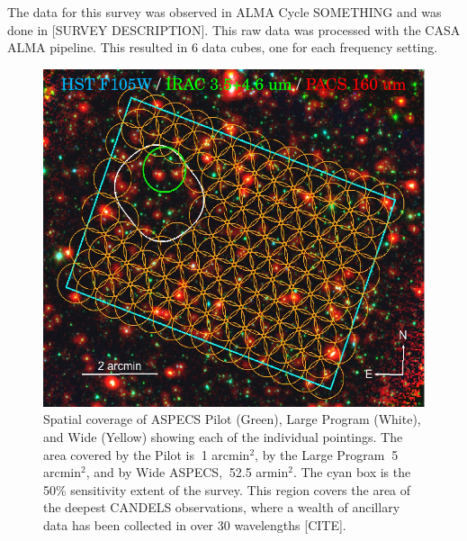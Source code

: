 The data for this survey was observed in ALMA Cycle SOMETHING and was done in [SURVEY DESCRIPTION]. This raw data was processed with the CASA ALMA pipeline. This resulted in 6 data cubes, one for each frequency setting. 

\begin{figure}[tbp]
\centering \includegraphics[width=120mm]{Wide_ASPECS_Coverage.png}
\caption{Spatial coverage of ASPECS Pilot (Green), Large Program (White), and Wide (Yellow) showing each of the individual pointings. The area covered by the Pilot is $~$1 arcmin$^2$, by the Large Program $~$5 arcmin$^2$, and by Wide ASPECS, $~$52.5 armin$^2$. The cyan box is the 50\% sensitivity extent of the survey. This region covers the area of the deepest CANDELS observations, where a wealth of ancillary data has been collected in over 30 wavelengths [CITE].}
\label{fig:ASPECS_Coverage}
\end{figure}

